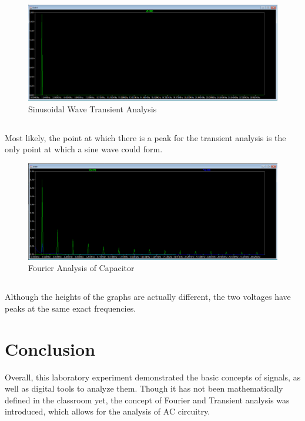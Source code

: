 \documentclass[
	letterpaper, %
	10pt, %
]{CSUniSchoolLabReport}
\begin{document}
\setcounter{subsection}{4}

\begin{figure}[h!]
  \centering
  \includegraphics[width=.8\textwidth]{Figures/L4FA4.png}
  \caption{Sinusoidal Wave Transient Analysis}
  \label{fig:4}
\end{figure}

\subsection{} Most likely, the point at which there is a peak for the transient analysis is the only point at which a sine wave could form.

\begin{figure}[h!]
  \centering
  \includegraphics[width=.8\textwidth]{Figures/L4FA5.png}
  \caption{Fourier Analysis of Capacitor}
  \label{fig:5}
\end{figure}

\subsection{} Although the heights of the graphs are actually different, the two voltages have peaks at the same exact frequencies.

\section{Conclusion}

Overall, this laboratory experiment demonstrated the basic concepts of signals, as well as digital tools to analyze them. Though it has not been mathematically defined in the classroom yet, the concept of Fourier and Transient analysis was introduced, which allows for the analysis of AC circuitry.
\end{document}
